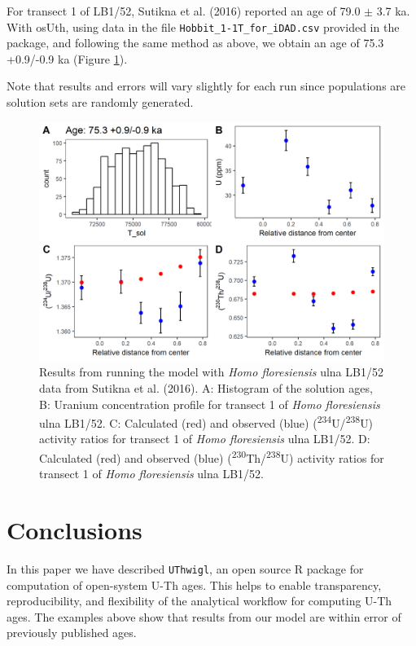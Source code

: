 \documentclass[]{elsarticle} %
\begin{document}
For transect 1 of LB1/52, Sutikna et al. (2016) reported an age of 79.0 \(\pm\) 3.7 ka. With osUth, using data in the file \texttt{Hobbit\_1-1T\_for\_iDAD.csv} provided in the package, and following the same method as above, we obtain an age of 75.3 +0.9/-0.9 ka (Figure \ref{fig:plot-panel-hobbit-fig}).

Note that results and errors will vary slightly for each run since populations are solution sets are randomly generated.

\newpage



\begin{figure}
\includegraphics[width=0.95\linewidth]{figures/plot-panel-hobbit} \caption{Results from running the model with \emph{Homo floresiensis} ulna LB1/52 data from Sutikna et al. (2016). A: Histogram of the solution ages, B: Uranium concentration profile for transect 1 of \emph{Homo floresiensis} ulna LB1/52. C: Calculated (red) and observed (blue) (\textsuperscript{234}U/\textsuperscript{238}U) activity ratios for transect 1 of \emph{Homo floresiensis} ulna LB1/52. D: Calculated (red) and observed (blue) (\textsuperscript{230}Th/\textsuperscript{238}U) activity ratios for transect 1 of \emph{Homo floresiensis} ulna LB1/52.}\label{fig:plot-panel-hobbit-fig}
\end{figure}

\FloatBarrier

\hypertarget{conclusions}{%
\section{Conclusions}\label{conclusions}}

In this paper we have described \texttt{UThwigl}, an open source R package for computation of open-system U-Th ages. This helps to enable transparency, reproducibility, and flexibility of the analytical workflow for computing U-Th ages. The examples above show that results from our model are within error of previously published ages.
\end{document}

